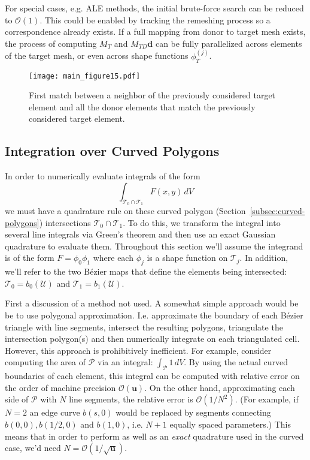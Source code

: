 \documentclass[letterpaper,10pt]{article}
\theoremstyle{definition}
\newcommand{\bigO}[1]{\mathcal{O}\left(#1\right)}
\newcommand{\mach}{\mathbf{u}}
\newcommand{\utri}{\mathcal{U}}
\begin{document}
For special cases, e.g. ALE methods, the initial brute-force search
can be reduced to \(\bigO{1}\). This could be enabled by tracking
the remeshing process so a correspondence already exists. If a full
mapping from donor to target mesh exists, the process of computing
\(M_T\) and \(M_{TD} \bm{d}\) can be fully parallelized across
elements of the target mesh, or even across shape functions
\(\phi_T^{(j)}\).

\begin{figure}
  \texttt{[image: main\_figure15.pdf]}
  \centering
  \captionsetup{width=.75\linewidth}
  \caption{First match between a neighbor of the previously considered
    target element and all the donor elements that match the
    previously considered target element.}
  \label{fig:target-elt-neighbor}
\end{figure}

\subsection{Integration over Curved Polygons}
\label{subsec:integration-on-curved}

In order to numerically evaluate integrals of the form
\begin{equation}
\int_{\mathcal{T}_0 \cap \mathcal{T}_1} F(x, y) \, dV
\end{equation}
we must have a quadrature rule on these curved polygon
(Section~\ref{subsec:curved-polygons}) intersections
\(\mathcal{T}_0 \cap \mathcal{T}_1\).
To do this, we transform the integral into several line integrals
via Green's theorem and then use an exact Gaussian quadrature to
evaluate them. Throughout this section we'll assume the integrand
is of the form \(F = \phi_0 \phi_1\) where each \(\phi_j\) is a shape
function on \(\mathcal{T}_j\). In addition, we'll refer to the two
B\'{e}zier maps that define the elements being intersected:
\(\mathcal{T}_0 = b_0\left(\utri\right)\) and
\(\mathcal{T}_1 = b_1\left(\utri\right)\).

First a discussion of a method not used. A somewhat simple approach would be
be to use polygonal approximation. I.e. approximate the boundary of each
B\'{e}zier triangle with line segments, intersect the resulting polygons,
triangulate the intersection polygon(s) and then numerically integrate
on each triangulated cell. However, this approach is prohibitively inefficient.
For example, consider computing the area of \(\mathcal{P}\) via an
integral: \(\int_{\mathcal{P}} 1 \, dV\). By using the actual curved
boundaries of each element, this integral can be computed with relative
error on the order of machine precision \(\bigO{\mach}\). On the other hand,
approximating each side of \(\mathcal{P}\) with \(N\) line segments, the
relative error is \(\bigO{1/N^2}\). (For example, if \(N = 2\) an edge
curve \(b(s, 0)\) would be replaced by segments connecting \(b(0, 0),
b(1/2, 0)\) and \(b(1, 0)\), i.e. \(N + 1\) equally spaced parameters.) This
means that in order to perform as well as an \emph{exact} quadrature used in
the curved case, we'd need \(N = \bigO{1/\sqrt{\mach}}\).
\end{document}
